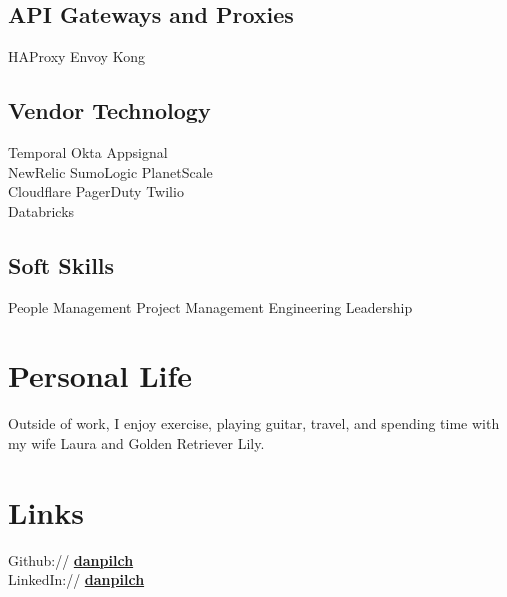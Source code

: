 \documentclass[]{resume}
\begin{document}
\begin{minipage}[t]{0.33\textwidth}
\subsection{API Gateways and Proxies}
HAProxy \textbullet{} Envoy \textbullet{} Kong \\
\sectionsep

\subsection{Vendor Technology}
Temporal \textbullet{} Okta \textbullet{} Appsignal \\
NewRelic \textbullet{} SumoLogic \textbullet{} PlanetScale \\
Cloudflare \textbullet{} PagerDuty \textbullet{} Twilio \\
Databricks
\sectionsep

\subsection{Soft Skills}
People Management \textbullet{} Project Management \textbullet{} Engineering Leadership \\
\sectionsep


\section{Personal Life}
Outside of work, I enjoy exercise, playing guitar, travel, and spending time with my wife Laura and Golden Retriever Lily.
\sectionsep


\section{Links}
Github:// \href{https://github.com/danpilch}{\bf danpilch} \\
LinkedIn://  \href{https://www.linkedin.com/in/danpilch}{\bf danpilch}
\sectionsep

\end{minipage}
\end{document}
